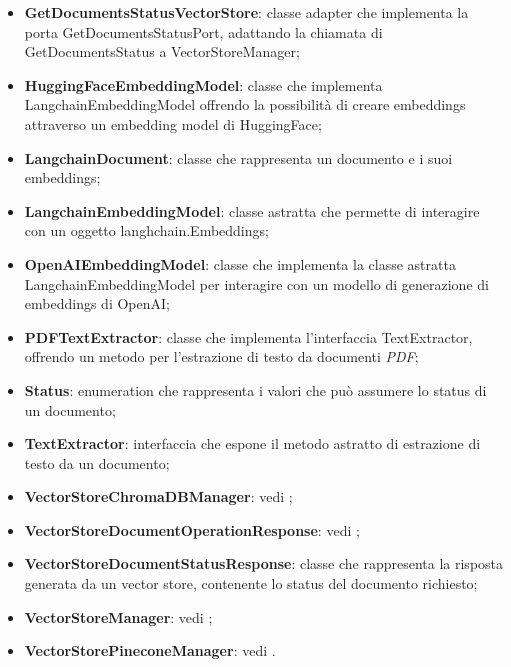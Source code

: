 \documentclass[10pt, a4paper]{article}
\begin{document}
\begin{itemize}
    \item \label{GetDocumentsStatusVectorStore}\textbf{GetDocumentsStatusVectorStore}: classe adapter che implementa la porta GetDocumentsStatusPort, adattando la chiamata di GetDocumentsStatus a VectorStoreManager;
    \item \label{HuggingFaceEmbeddingModel}\textbf{HuggingFaceEmbeddingModel}: classe che implementa LangchainEmbeddingModel offrendo la possibilità di creare embeddings attraverso un embedding model di HuggingFace;
    \item \label{LangchainDocument}\textbf{LangchainDocument}: classe che rappresenta un documento e i suoi embeddings;    
    \item \label{LangchainEmbeddingModel}\textbf{LangchainEmbeddingModel}: classe astratta che permette di interagire con un oggetto langhchain.Embeddings;
    \item \label{OpenAIEmbeddingModel}\textbf{OpenAIEmbeddingModel}: classe che implementa la classe astratta LangchainEmbeddingModel per interagire con un modello di generazione di embeddings di OpenAI;
    \item \label{PDFTextExtractor}\textbf{PDFTextExtractor}: classe che implementa l'interfaccia TextExtractor, offrendo un metodo per l'estrazione di testo da documenti \textit{PDF\pg};
    \item \label{Status}\textbf{Status}: enumeration che rappresenta i valori che può assumere lo status di un documento;
    \item \label{TextExtractor}\textbf{TextExtractor}: interfaccia che espone il metodo astratto di estrazione di testo da un documento;   
    \item \textbf{VectorStoreChromaDBManager}: vedi ;
    \item \textbf{VectorStoreDocumentOperationResponse}: vedi ;
    \item \label{VectorStoreDocumentStatusResponse}\textbf{VectorStoreDocumentStatusResponse}: classe che rappresenta la risposta generata da un vector store, contenente lo status del documento richiesto;
    \item \textbf{VectorStoreManager}: vedi ;
    \item \textbf{VectorStorePineconeManager}: vedi .
\end{itemize}
\end{document}
